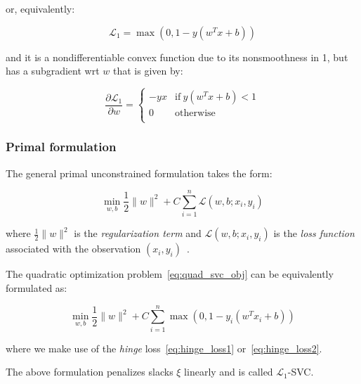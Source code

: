 or, equivalently:

\begin{equation} \label{eq:hinge_loss2}
	\mathcal{L}_1 = \max(0, 1 - y (w^T x + b))
\end{equation}

and it is a nondifferentiable convex function due to its nonsmoothness in 1, but has a subgradient wrt $w$ that is given by:

\begin{equation} \label{eq:hinge_loss_der}
    \frac{\partial \mathcal{L}_1}{\partial w}=
        \begin{cases}
            -y x & \text{if} \ y (w^T x + b) < 1 \\
            0 & \text{otherwise} \\ 
        \end{cases}
\end{equation}

\subsubsection{Primal formulation}

The general primal unconstrained formulation takes the form:

\begin{equation} \label{eq:primal_svm}
    \min_{w,b} \frac{1}{2} \| w \|^2 + C \sum_{i=1}^n \mathcal{L}(w,b;x_i,y_i)
\end{equation}

where $\displaystyle \frac{1}{2} \| w \|^2$ is the \emph{regularization term} and $\mathcal{L}(w,b;x_i,y_i)$ is the \emph{loss function} associated with the observation $(x_i,y_i)$~\cite{piccialli2018nonlinear}.

The quadratic optimization problem~\eqref{eq:quad_svc_obj} can be equivalently formulated as:

\begin{equation} \label{eq:primal_svc_hinge}
    \min_{w,b} \frac{1}{2} \| w \|^2 + C \sum_{i=1}^n \max(0, 1 - y_i (w^T x_i + b))
\end{equation}

where we make use of the \emph{hinge} loss~\eqref{eq:hinge_loss1} or~\eqref{eq:hinge_loss2}.

The above formulation penalizes slacks $\xi$ linearly and is called $\mathcal{L}_1$-SVC.

